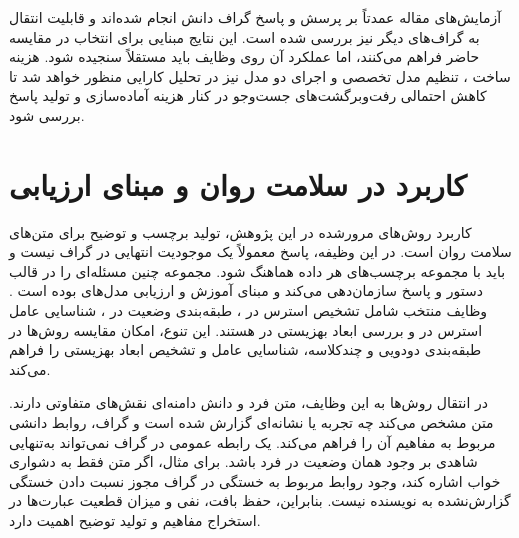 آزمایش‌های مقاله عمدتاً بر پرسش و پاسخ گراف دانش انجام شده‌اند و قابلیت انتقال به گراف‌های دیگر نیز بررسی شده است. این نتایج مبنایی برای انتخاب  در مقایسه حاضر فراهم می‌کنند، اما عملکرد آن روی وظایف  باید مستقلاً سنجیده شود. هزینه ساخت ، تنظیم مدل تخصصی و اجرای دو مدل نیز در تحلیل کارایی منظور خواهد شد تا کاهش احتمالی رفت‌وبرگشت‌های جست‌وجو در کنار هزینه آماده‌سازی و تولید پاسخ بررسی شود.

\section{کاربرد در سلامت روان و مبنای ارزیابی}

کاربرد روش‌های مرورشده در این پژوهش، تولید برچسب و توضیح برای متن‌های سلامت روان است. در این وظیفه، پاسخ معمولاً یک موجودیت انتهایی در گراف نیست و باید با مجموعه برچسب‌های هر داده هماهنگ شود. مجموعه  چنین مسئله‌ای را در قالب دستور و پاسخ سازمان‌دهی می‌کند و مبنای آموزش و ارزیابی مدل‌های  بوده است \cite{yang2024mentallama}. وظایف منتخب شامل تشخیص استرس در ، طبقه‌بندی وضعیت در ، شناسایی عامل استرس در  و بررسی ابعاد بهزیستی در  هستند. این تنوع، امکان مقایسه روش‌ها در طبقه‌بندی دودویی و چندکلاسه، شناسایی عامل و تشخیص ابعاد بهزیستی را فراهم می‌کند.

در انتقال روش‌ها به این وظایف، متن فرد و دانش دامنه‌ای نقش‌های متفاوتی دارند. متن مشخص می‌کند چه تجربه یا نشانه‌ای گزارش شده است و گراف، روابط دانشی مربوط به مفاهیم آن را فراهم می‌کند. یک رابطه عمومی در گراف نمی‌تواند به‌تنهایی شاهدی بر وجود همان وضعیت در فرد باشد. برای مثال، اگر متن فقط به دشواری خواب اشاره کند، وجود روابط مربوط به خستگی در گراف مجوز نسبت دادن خستگی گزارش‌نشده به نویسنده نیست. بنابراین، حفظ بافت، نفی و میزان قطعیت عبارت‌ها در استخراج مفاهیم و تولید توضیح اهمیت دارد.

